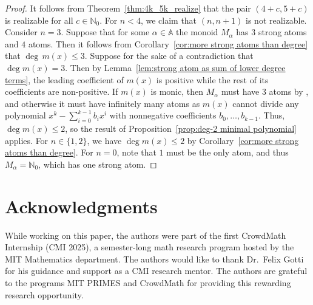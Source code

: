 \documentclass[11pt]{amsart}
\theoremstyle{definition}
\theoremstyle{remark}
\numberwithin{equation}{section}
\newcommand{\aaa}{\mathbb{A}}
\newcommand{\nn}{\mathbb{N}}
\begin{document}
\begin{proof}
    It follows from Theorem~\ref{thm:4k_5k_realize} that the pair $(4+c, 5+c)$ is realizable for all $c \in \nn_0$. For $n<4$, we claim that $(n,n+1)$ is not realizable. Consider $n=3$. Suppose that for some $\alpha\in\aaa$ the monoid $M_\alpha$ has $3$ strong atoms and $4$ atoms. Then it follows from Corollary~\ref{cor:more strong atoms than degree} that $\deg \, m(x) \le 3$. Suppose for the sake of a contradiction that $\deg m(x) = 3$. Then by Lemma~\ref{lem:strong atom as sum of lower degree terms}, the leading coefficient of $m(x)$ is positive while the rest of its coefficients are non-positive. If $m(x)$ is monic, then $M_\alpha$ must have $3$ atoms by \cite[Theorem~5.4]{CG22}, and otherwise it must have infinitely many atoms as $m(x)$ cannot divide any polynomial $x^k-\sum_{i=0}^{k-1} b_ix^i$ with nonnegative coefficients $b_0, \dots, b_{k-1}$. Thus, $\deg m(x) \le 2$, so the result of Proposition~\ref{prop:deg-2 minimal polynomial} applies. For $n\in\{1,2\}$, we have $\deg m(x) \le 2$ by Corollary~\ref{cor:more strong atoms than degree}. For $n=0$, note that $1$ must be the only atom, and thus $M_\alpha=\nn_0$, which has one strong atom.
\end{proof}


\bigskip
\section*{Acknowledgments}

While working on this paper, the authors were part of the first CrowdMath Internship (CMI 2025), a semester-long math research program hosted by the MIT Mathematics department. The authors would like to thank Dr.~Felix Gotti for his guidance and support as a CMI research mentor. The authors are grateful to the programs MIT PRIMES and CrowdMath for providing this rewarding research opportunity.

\end{document}
